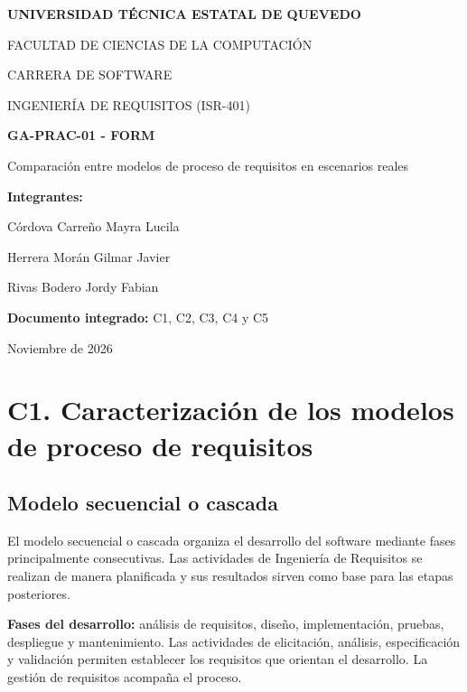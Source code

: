 \documentclass[12pt,a4paper]{article}
\begin{document}
\begin{titlepage}
\centering
{\bfseries UNIVERSIDAD TÉCNICA ESTATAL DE QUEVEDO\par}
\vspace{0.7cm}
FACULTAD DE CIENCIAS DE LA COMPUTACIÓN\par
CARRERA DE SOFTWARE\par
INGENIERÍA DE REQUISITOS (ISR-401)\par
\vfill
{\Large\bfseries GA-PRAC-01 - FORM\par}
\vspace{0.5cm}
{\large Comparación entre modelos de proceso de requisitos en escenarios reales\par}
\vspace{1cm}
\textbf{Integrantes:}\par
Córdova Carreño Mayra Lucila\par
Herrera Morán Gilmar Javier\par
Rivas Bodero Jordy Fabian\par
\vspace{0.8cm}
\textbf{Documento integrado:} C1, C2, C3, C4 y C5\par
\vfill
Noviembre de 2026\par
\end{titlepage}
\tableofcontents
\clearpage


\section{C1. Caracterización de los modelos de proceso de requisitos}

\subsection{Modelo secuencial o cascada}

El modelo secuencial o cascada organiza el desarrollo del software mediante fases principalmente consecutivas. Las actividades de Ingeniería de Requisitos se realizan de manera planificada y sus resultados sirven como base para las etapas posteriores.

\textbf{Fases del desarrollo:} análisis de requisitos, diseño, implementación, pruebas, despliegue y mantenimiento. Las actividades de elicitación, análisis, especificación y validación permiten establecer los requisitos que orientan el desarrollo. La gestión de requisitos acompaña el proceso.
\end{document}
